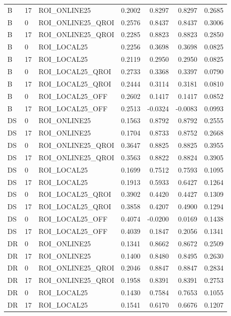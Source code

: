\begin{longtable}{llp{.29\linewidth}rrrr}
B & 17 & ROI\_ONLINE25 & 0.2002 & 0.8297 & 0.8297 & 0.2685 \\
B & 0 & ROI\_ONLINE25\_QROI & 0.2576 & 0.8437 & 0.8437 & 0.3006 \\
B & 17 & ROI\_ONLINE25\_QROI & 0.2285 & 0.8823 & 0.8823 & 0.2850 \\
B & 0 & ROI\_LOCAL25 & 0.2256 & 0.3698 & 0.3698 & 0.0825 \\
B & 17 & ROI\_LOCAL25 & 0.2119 & 0.2950 & 0.2950 & 0.0825 \\
B & 0 & ROI\_LOCAL25\_QROI & 0.2733 & 0.3368 & 0.3397 & 0.0790 \\
B & 17 & ROI\_LOCAL25\_QROI & 0.2444 & 0.3114 & 0.3181 & 0.0810 \\
B & 0 & ROI\_LOCAL25\_OFF & 0.2602 & 0.1417 & 0.1417 & 0.0852 \\
B & 17 & ROI\_LOCAL25\_OFF & 0.2513 & -0.0324 & -0.0083 & 0.0993 \\
DS & 0 & ROI\_ONLINE25 & 0.1563 & 0.8792 & 0.8792 & 0.2555 \\
DS & 17 & ROI\_ONLINE25 & 0.1704 & 0.8733 & 0.8752 & 0.2668 \\
DS & 0 & ROI\_ONLINE25\_QROI & 0.3647 & 0.8825 & 0.8825 & 0.3955 \\
DS & 17 & ROI\_ONLINE25\_QROI & 0.3563 & 0.8822 & 0.8824 & 0.3905 \\
DS & 0 & ROI\_LOCAL25 & 0.1699 & 0.7512 & 0.7593 & 0.1095 \\
DS & 17 & ROI\_LOCAL25 & 0.1913 & 0.5933 & 0.6427 & 0.1264 \\
DS & 0 & ROI\_LOCAL25\_QROI & 0.3902 & 0.4420 & 0.4427 & 0.1309 \\
DS & 17 & ROI\_LOCAL25\_QROI & 0.3858 & 0.4207 & 0.4900 & 0.1294 \\
DS & 0 & ROI\_LOCAL25\_OFF & 0.4074 & -0.0200 & 0.0169 & 0.1438 \\
DS & 17 & ROI\_LOCAL25\_OFF & 0.4039 & 0.1847 & 0.2056 & 0.1341 \\
DR & 0 & ROI\_ONLINE25 & 0.1341 & 0.8662 & 0.8672 & 0.2509 \\
DR & 17 & ROI\_ONLINE25 & 0.1400 & 0.8480 & 0.8495 & 0.2630 \\
DR & 0 & ROI\_ONLINE25\_QROI & 0.2046 & 0.8847 & 0.8847 & 0.2834 \\
DR & 17 & ROI\_ONLINE25\_QROI & 0.1958 & 0.8391 & 0.8391 & 0.2753 \\
DR & 0 & ROI\_LOCAL25 & 0.1430 & 0.7584 & 0.7653 & 0.1055 \\
DR & 17 & ROI\_LOCAL25 & 0.1541 & 0.6170 & 0.6676 & 0.1207 \\

\end{longtable}
